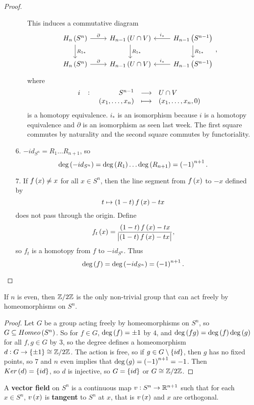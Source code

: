 \begin{proof}
\begin{itemize}
\begin{itemize}[leftmargin=2cm]
This induces a commutative diagram
$$
\begin{tikzcd}
H_n\br{S^n} \arrow{r}{\partial} \arrow{d}{R_{1*}} & H_{n - 1}\br{U \cap V} \arrow{d}{R_{1*}} & H_{n - 1}\br{S^{n - 1}}\arrow[swap]{l}{i_*} \arrow{d}{R_{1*}} \\
H_n\br{S^n} \arrow{r}{\partial} & H_{n - 1}\br{U \cap V} & H_{n - 1}\br{S^{n - 1}}\arrow[swap]{l}{i_*}
\end{tikzcd},
$$
where
$$ \function[i]{S^{n - 1}}{U \cap V}{\br{x_1, \dots, x_n}}{\br{x_1, \dots, x_n, 0}} $$
is a homotopy equivalence. $ i_* $ is an isomorphism because $ i $ is a homotopy equivalence and $ \partial $ is an isomorphism as seen last week. The first square commutes by naturality and the second square commutes by functoriality.
\end{itemize}
\item[$ 6 $.] $ -id_{S^n} = R_1 \dots R_{n + 1} $, so
$$ \deg\br{-id_{S^n}} = \deg\br{R_1} \dots \deg\br{R_{n + 1}} = \br{-1}^{n + 1}. $$
\item[$ 7 $.] If $ f\br{x} \ne x $ for all $ x \in S^n $, then the line segment from $ f\br{x} $ to $ -x $ defined by
$$ t \mapsto \br{1 - t}f\br{x} - tx $$
does not pass through the origin. Define
$$ f_t\br{x} = \dfrac{\br{1 - t}f\br{x} - tx}{\abs{\br{1 - t}f\br{x} - tx}}, $$
so $ f_t $ is a homotopy from $ f $ to $ -id_{S^n} $. Thus
$$ \deg\br{f} = \deg\br{-id_{S^n}} = \br{-1}^{n + 1}. $$
\end{itemize}
\end{proof}

\begin{proposition}
If $ n $ is even, then $ \mathbb{Z} / 2\mathbb{Z} $ is the only non-trivial group that can act freely by homeomorphisms on $ S^n $.
\end{proposition}

\begin{proof}
Let $ G $ be a group acting freely by homeomorphisms on $ S^n $, so $ G \subseteq Homeo\br{S^n} $. So for $ f \in G $, $ \deg\br{f} = \pm 1 $ by $ 4 $, and $ \deg\br{fg} = \deg\br{f}\deg\br{g} $ for all $ f, g \in G $ by $ 3 $, so the degree defines a homeomorphism $ d : G \to \cbr{\pm 1} \cong \Z / 2\Z $. The action is free, so if $ g \in G \setminus \cbr{id} $, then $ g $ has no fixed points, so $ 7 $ and $ n $ even implies that $ \deg\br{g} = \br{-1}^{n + 1} = -1 $. Then $ Ker\br{d} = \cbr{id} $, so $ d $ is injective, so $ G = \cbr{id} $ or $ G \cong \mathbb{Z} / 2\mathbb{Z} $.
\end{proof}

\begin{definition*}
A \textbf{vector field} on $ S^n $ is a continuous map $ v : S^n \to \mathbb{R}^{n + 1} $ such that for each $ x \in S^n $, $ v\br{x} $ is \textbf{tangent} to $ S^n $ at $ x $, that is $ v\br{x} $ and $ x $ are orthogonal.
\end{definition*}

